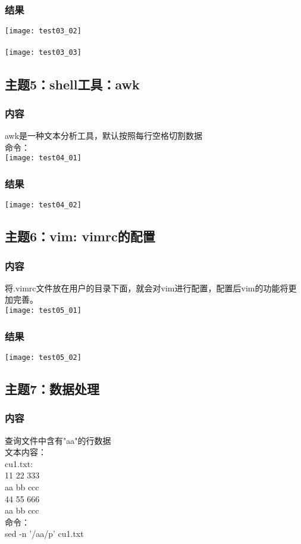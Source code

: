 \documentclass{article}
\begin{document}
\subsubsection{结果} 
\texttt{[image: test03\_02]}\\\\
\texttt{[image: test03\_03]}\\
\subsection{主题5：shell工具：awk}  
\subsubsection{内容}
awk是一种文本分析工具，默认按照每行空格切割数据\\
命令：\\
\texttt{[image: test04\_01]}\\
\subsubsection{结果} 
\texttt{[image: test04\_02]}\\
\subsection{主题6：vim: vimrc的配置}  
\subsubsection{内容}
将.vimrc文件放在用户的目录下面，就会对vim进行配置，配置后vim的功能将更加完善。\\
\texttt{[image: test05\_01]}\\
\subsubsection{结果} 
\texttt{[image: test05\_02]}\\
\subsection{主题7：数据处理}  
\subsubsection{内容}
查询文件中含有"aa"的行数据\\
文本内容：\\
cu1.txt:\\
11 22 333\\
aa bb ccc\\
44 55 666\\
aa bb ccc\\
命令：\\
sed -n '/aa/p' cu1.txt
\end{document}
